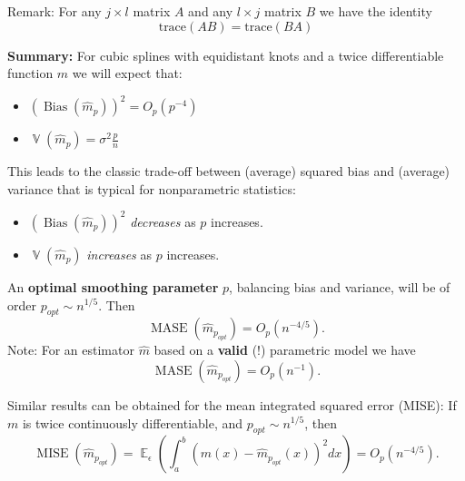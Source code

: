 \documentclass[14pt]{extreport}\usepackage[]{graphicx}\usepackage[]{xcolor}
\DeclareMathOperator{\E}{\mathbb{E}}
\DeclareMathOperator{\V}{\mathbb{V}}
\begin{document}
Remark: For any $j\times l$ matrix $A$ and any $l\times j$ matrix $B$ we have the identity
$$\text{trace}(AB)=\text{trace}(BA)$$


\bigskip


\textbf{Summary:} For cubic splines with equidistant knots and a twice differentiable function $m$ we will expect that:
\begin{itemize}
\item $(\operatorname{Bias}(\hat m_p))^2=O_p(p^{-4})$
\item $\V(\hat m_p)= \sigma^2\frac{p}{n}$
\end{itemize}

This leads to the classic trade-off between (average) squared bias and (average) variance that is typical for nonparametric statistics:
\begin{itemize}
\item $(\operatorname{Bias}(\hat m_p))^2$ {\sl decreases} as $p$ increases.
\item $\V(\hat m_p)$  {\it increases} as $p$ increases.
\end{itemize}
\bigskip




An \textbf{optimal smoothing parameter} $p$, balancing bias and variance, will be of order $p_{opt} \sim n^{1/5}$. Then
$$\operatorname{MASE}(\hat m_{p_{opt}})=O_p(n^{-4/5}).$$
Note: For an estimator $\hat m$ based on a \textbf{valid} (!) parametric model we have
$$\operatorname{MASE}(\hat m_{p_{opt}})=O_p(n^{-1}).$$


\bigskip

Similar results can be obtained for the mean integrated squared error (MISE): If $m$ is twice
continuously differentiable, and $p_{opt} \sim n^{1/5}$, then
$$\operatorname{MISE}(\hat m_{p_{opt}})=\E_\epsilon\left(\int_a^b(m(x)-\hat m_{p_{opt}}(x))^2dx\right)=O_p(n^{-4/5}).$$

\bigskip

% 
% 
% 

% 
\end{document}
